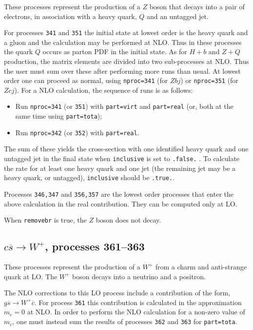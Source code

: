 \documentclass[12pt]{article}
\begin{document}
These processes represent the production of a $Z$
boson that decays into a pair of electrons,
in association with a heavy quark, $Q$ and an untagged jet.

For processes {\tt 341} and {\tt 351} the initial state at lowest
order is the heavy quark and a gluon and the calculation may be
performed at NLO.  Thus in these processes the quark $Q$ occurs as
parton PDF in the initial state.  As for $H+b$ and $Z+Q$ production,
the matrix elements are divided into two sub-processes at NLO. Thus
the user must sum over these after performing more runs than usual. At
lowest order one can proceed as normal, using {\tt nproc=341} (for
$Zbj$) or {\tt nproc=351} (for $Zcj$).  For a NLO calculation, the
sequence of runs is as follows:
\begin{itemize}
\item Run {\tt nproc=341} (or {\tt 351}) with {\tt part=virt} and
{\tt part=real} (or, both at the same time using {\tt part=tota});
\item Run {\tt nproc=342} (or {\tt 352}) with {\tt part=real}.
\end{itemize}
The sum of these yields the cross-section with one identified heavy
quark and one untagged jet in the final state when {\tt inclusive} is
set to {\tt .false.} . To calculate the rate for at least one heavy
quark and one jet (the remaining jet may be a heavy quark, or
untagged), {\tt inclusive} should be {\tt .true.}.

Processes {\tt 346,347} and {\tt 356,357} are the lowest order processes that enter
the above calculation in the real contribution. They can be computed only at LO.

When {\tt removebr} is true, the $Z$ boson does not decay.

\subsection{$c \overline s \to W^+$, processes 361--363}
\label{subsec:csbar}
These processes represent the production of a $W^+$ from a charm and anti-strange
quark at LO. The $W^+$ boson decays into a neutrino and a positron.

The NLO corrections to this LO process include a contribution of the form,
$g\overline s \to W^+ \overline c$. For process {\tt 361} this contribution is
calculated in the approximation $m_c=0$ at NLO. In order to perform the NLO calculation 
for a non-zero value of $m_c$, one must instead sum the results of processes {\tt 362}
and {\tt 363} for {\tt part=tota}.
\end{document}
